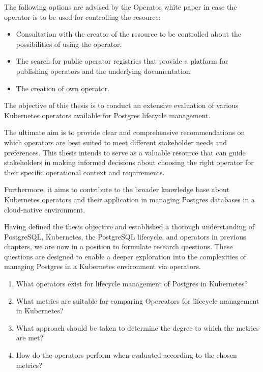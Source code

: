 The following options are advised by the Operator white paper \cite{operatorWhitepaper} in case the operator is to be used for controlling the resource:
\begin{itemize}
    \item	Consultation with the creator of the resource to be controlled about the possibilities of using the operator.
    \item	The search for public operator registries that provide a platform for publishing operators and the underlying documentation.
    \item	The creation of own operator.
\end{itemize}

\label{chap:objectives}
The objective of this thesis is to conduct an extensive evaluation of various Kubernetes operators available for Postgres lifecycle management.

The ultimate aim is to provide clear and comprehensive recommendations on which operators are best suited to meet different stakeholder needs and preferences. This thesis intends to serve as a valuable resource that can guide stakeholders in making informed decisions about choosing the right operator for their specific operational context and requirements.

Furthermore, it aims to contribute to the broader knowledge base about Kubernetes operators and their application in managing Postgres databases in a cloud-native environment.


\label{chap:resoourceQuestions}
Having defined the thesis objective and established a thorough understanding of PostgreSQL, Kubernetes, the PostgreSQL lifecycle, and operators in previous chapters, we are now in a position to formulate research questions.
These questions are designed to enable a deeper exploration into the complexities of managing Postgres in a Kubernetes environment via operators.

\begin{enumerate}
    \item What operators exist for lifecycle management of Postgres in Kubernetes?
    \item What metrics are suitable for comparing Opereators for lifecycle management in Kubernetes?
    \item What approach should be taken to determine the degree to which the metrics are met?
    \item How do the operators perform when evaluated according to the chosen metrics?
\end{enumerate}

